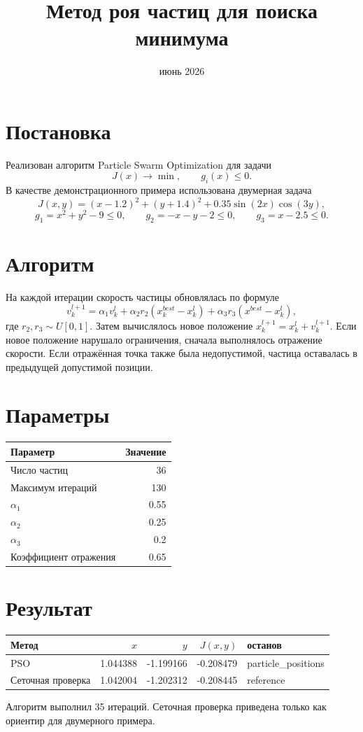 \documentclass[12pt,a4paper]{article}
\title{Метод роя частиц для поиска минимума}
\author{}
\date{июнь 2026}
\begin{document}
\maketitle

\section*{Постановка}
Реализован алгоритм Particle Swarm Optimization для задачи
\[
J(x)\to\min,\qquad g_i(x)\le 0.
\]
В качестве демонстрационного примера использована двумерная задача
\[
J(x,y)=(x-1.2)^2+(y+1.4)^2+0.35\sin(2x)\cos(3y),
\]
\[
g_1=x^2+y^2-9\le 0,\qquad
 g_2=-x-y-2\le 0,\qquad
 g_3=x-2.5\le 0.
\]

\section*{Алгоритм}
На каждой итерации скорость частицы обновлялась по формуле
\[
v_k^{l+1}=\alpha_1v_k^l+\alpha_2r_2(x_k^{best}-x_k^l)+\alpha_3r_3(x^{best}-x_k^l),
\]
где $r_2,r_3\sim U[0,1]$. Затем вычислялось новое положение $x_k^{l+1}=x_k^l+v_k^{l+1}$.
Если новое положение нарушало ограничения, сначала выполнялось отражение скорости. Если отражённая точка также была недопустимой, частица оставалась в предыдущей допустимой позиции.

\section*{Параметры}
\begin{center}
\begin{tabular}{lr}
\toprule
Параметр & Значение \\
\midrule
Число частиц & 36 \\
Максимум итераций & 130 \\
$\alpha_1$ & 0.55 \\
$\alpha_2$ & 0.25 \\
$\alpha_3$ & 0.2 \\
Коэффициент отражения & 0.65 \\
\bottomrule
\end{tabular}
\end{center}

\section*{Результат}
\begin{center}
\begin{tabular}{lrrrl}
\toprule
Метод & $x$ & $y$ & $J(x,y)$ & останов \\
\midrule
PSO & 1.044388 & -1.199166 & -0.208479 & particle\_positions \\
Сеточная проверка & 1.042004 & -1.202312 & -0.208445 & reference \\
\bottomrule
\end{tabular}
\end{center}
Алгоритм выполнил 35 итераций. Сеточная проверка приведена только как ориентир для двумерного примера.
\end{document}
